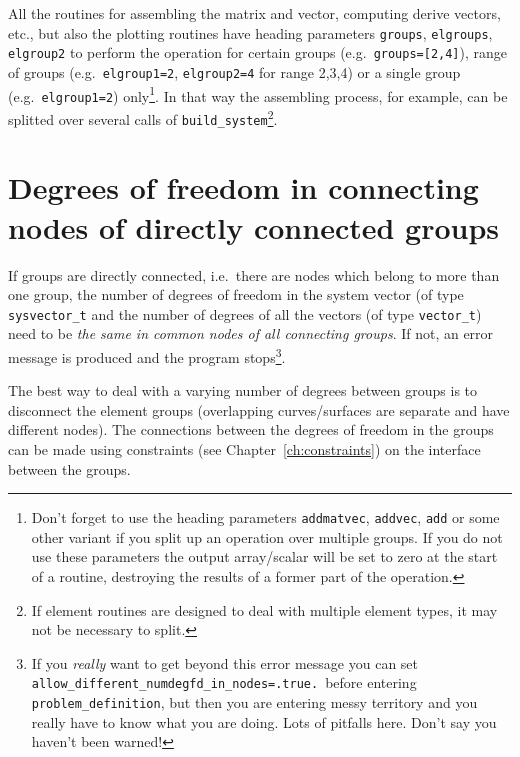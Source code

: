 All the routines for assembling the matrix and vector, computing derive vectors,
etc., but also the plotting routines have heading parameters \texttt{groups},
\texttt{elgroups}, \texttt{elgroup2} to perform the operation for
certain groups (e.g.\ \texttt{groups=[2,4]}),
range of groups (e.g.\ \texttt{elgroup1=2}, \texttt{elgroup2=4} for range
2,3,4) or a single group (e.g.\ \texttt{elgroup1=2})
only\footnote{Don't forget to use the
heading parameters \texttt{addmatvec}, \texttt{addvec}, \texttt{add} or some
other variant if you split up an operation over multiple groups. If you do not
use these parameters the output array/scalar will be set to zero at the start
of a routine, destroying the results of a former part of the operation.}. In
that way the assembling process, for example, can be splitted over several
calls of \texttt{build\_system}\footnote{If
element routines are designed to deal with multiple element types, it may not
be necessary to split.}.

\section{Degrees of freedom in connecting nodes of directly connected groups}

If groups are directly connected, i.e.\ there are nodes which belong to more
than one group, the number of degrees of freedom in the system vector
(of type \texttt{sysvector\_t} and
the number of degrees of all the vectors (of type \texttt{vector\_t}) need to
be \emph{the same in common nodes of all connecting groups}. If not, an error
message is produced and the program stops\footnote{If you \emph{really} want
to get beyond this error message you can set
\texttt{allow\_different\_numdegfd\_in\_nodes=.true.}\ before entering 
\texttt{problem\_definition}, but then you are entering messy territory and you
really have to know what you are doing. Lots of pitfalls here. Don't say you
haven't been warned!}. 

The best way to deal with a varying number of degrees between groups is to
disconnect
the element groups (overlapping curves/surfaces are separate and have different nodes).
The connections between the degrees of freedom in the groups can be made using
constraints (see Chapter~\ref{ch:constraints})
on the interface between the groups.


